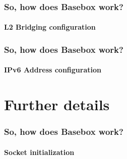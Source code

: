 \documentclass[11pt]{beamer}
\begin{document}
\begin{frame}
\frametitle{So, how does Basebox work?}
\framesubtitle{L2 Bridging configuration}

\end{frame}

\begin{frame}
\frametitle{So, how does Basebox work?}
\framesubtitle{IPv6 Address configuration}


\end{frame}



\section{Further details}
\begin{frame}
\frametitle{So, how does Basebox work?}
\framesubtitle{Socket initialization}

\end{frame}




\end{document}
